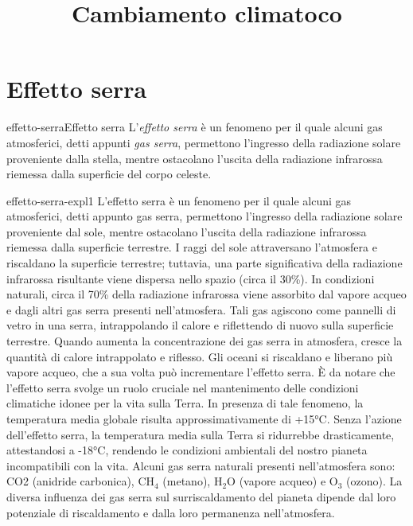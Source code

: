 \documentclass[preview]{standalone}
\begin{document}
\title{Cambiamento climatoco}
\genpage

\section{Effetto serra}

\begin{snippetdefinition}{effetto-serra}{Effetto serra}
    L'\textit{effetto serra} è un fenomeno per il quale alcuni gas
    atmosferici, detti appunti \textit{gas serra},
    permettono l'ingresso della radiazione solare proveniente dalla stella, 
    mentre ostacolano l'uscita della radiazione infrarossa riemessa dalla
    superficie del corpo celeste.
\end{snippetdefinition}


\begin{snippet}{effetto-serra-expl1}
    L'effetto serra è un fenomeno per il quale alcuni gas atmosferici, detti appunto gas serra,
    permettono l'ingresso della radiazione solare proveniente dal sole, mentre ostacolano
    l'uscita della radiazione infrarossa riemessa dalla superficie terrestre.
    I raggi del sole attraversano l'atmosfera e riscaldano la superficie terrestre; tuttavia, una
    parte significativa della radiazione infrarossa risultante viene dispersa nello spazio (circa il
    30\%). In condizioni naturali, circa il 70\% della radiazione infrarossa viene assorbito dal
    vapore acqueo e dagli altri gas serra presenti nell'atmosfera. Tali gas agiscono come
    pannelli di vetro in una serra, intrappolando il calore e riflettendo di nuovo sulla superficie
    terrestre. Quando aumenta la concentrazione dei gas serra in atmosfera, cresce la quantità
    di calore intrappolato e riflesso. Gli oceani si riscaldano e liberano più vapore acqueo, che
    a sua volta può incrementare l'effetto serra.
    È da notare che l'effetto serra svolge un ruolo cruciale nel mantenimento delle condizioni
    climatiche idonee per la vita sulla Terra. In presenza di tale fenomeno, la temperatura media
    globale risulta approssimativamente di +15°C. Senza l'azione dell'effetto serra, la
    temperatura media sulla Terra si ridurrebbe drasticamente, attestandosi a -18°C, rendendo
    le condizioni ambientali del nostro pianeta incompatibili con la vita.
    Alcuni gas serra naturali presenti nell'atmosfera sono: CO2 (anidride carbonica), CH\({}_4\)
    (metano), H\({}_2\)O (vapore acqueo) e O\({}_3\) (ozono). La diversa influenza dei gas serra sul
    surriscaldamento del pianeta dipende dal loro potenziale di riscaldamento e dalla loro
    permanenza nell'atmosfera.
\end{snippet}
\end{document}
